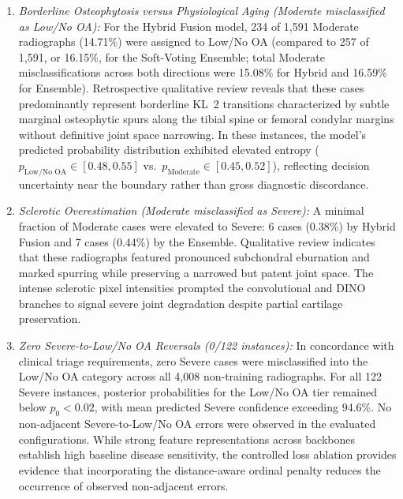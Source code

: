\documentclass[10pt,journal]{IEEEtran}
\begin{document}
\begin{enumerate}[leftmargin=*]
\item \textit{Borderline Osteophytosis versus Physiological Aging (Moderate misclassified as Low/No OA):} For the Hybrid Fusion model, 234 of 1,591 Moderate radiographs (14.71\%) were assigned to Low/No OA (compared to 257 of 1,591, or 16.15\%, for the Soft-Voting Ensemble; total Moderate misclassifications across both directions were 15.08\% for Hybrid and 16.59\% for Ensemble). Retrospective qualitative review reveals that these cases predominantly represent borderline KL~2 transitions characterized by subtle marginal osteophytic spurs along the tibial spine or femoral condylar margins without definitive joint space narrowing. In these instances, the model's predicted probability distribution exhibited elevated entropy ($p_{\text{Low/No OA}} \in [0.48, 0.55]$ vs.\ $p_{\text{Moderate}} \in [0.45, 0.52]$), reflecting decision uncertainty near the boundary rather than gross diagnostic discordance.
\item \textit{Sclerotic Overestimation (Moderate misclassified as Severe):} A minimal fraction of Moderate cases were elevated to Severe: 6 cases (0.38\%) by Hybrid Fusion and 7 cases (0.44\%) by the Ensemble. Qualitative review indicates that these radiographs featured pronounced subchondral eburnation and marked spurring while preserving a narrowed but patent joint space. The intense sclerotic pixel intensities prompted the convolutional and DINO branches to signal severe joint degradation despite partial cartilage preservation.
\item \textit{Zero Severe-to-Low/No OA Reversals (0/122 instances):} In concordance with clinical triage requirements, zero Severe cases were misclassified into the Low/No OA category across all 4,008 non-training radiographs. For all 122 Severe instances, posterior probabilities for the Low/No OA tier remained below $p_0 < 0.02$, with mean predicted Severe confidence exceeding 94.6\%. No non-adjacent Severe-to-Low/No OA errors were observed in the evaluated configurations. While strong feature representations across backbones establish high baseline disease sensitivity, the controlled loss ablation provides evidence that incorporating the distance-aware ordinal penalty reduces the occurrence of observed non-adjacent errors.
\end{enumerate}


\FloatBarrier
\end{document}
